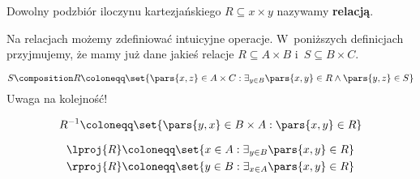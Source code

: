 \begin{definition}[Relacja]
Dowolny podzbiór iloczynu kartezjańskiego \(R \subseteq x \times y\) nazywamy \textbf{relacją}.
\end{definition}
Na relacjach możemy zdefiniować intuicyjne operacje. W~poniższych definicjach przyjmujemy, że mamy już dane jakieś relacje \(R \subseteq A \times B\) i~\(S \subseteq B \times C\).
\begin{definition}
\begin{equation*}
    S \composition R
        \coloneqq \set{\pars{x, z} \in A \times C : \exists_{y \in B} \pars{x, y} \in R \land \pars{y, z} \in S}
\end{equation*}
Uwaga na kolejność!
\end{definition}
\begin{definition}
\begin{equation*}
    R^{-1} \coloneqq \set{\pars{y, x} \in B \times A : \pars{x, y} \in R}
\end{equation*}
\end{definition}
\begin{definition}[Projekcje]
\begin{align*}
    \lproj{R} &\coloneqq \set{x \in A : \exists_{y \in B} \pars{x, y} \in R}\\
    \rproj{R} &\coloneqq \set{y \in B : \exists_{x \in A} \pars{x, y} \in R}\\
\end{align*}
\end{definition}